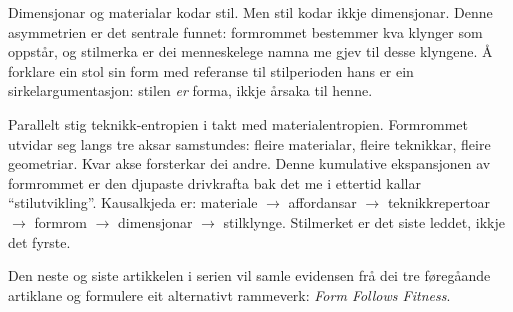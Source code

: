 \documentclass[10pt, a4paper, twocolumn]{article}
\begin{document}
Dimensjonar og materialar kodar stil. Men stil kodar ikkje dimensjonar. Denne asymmetrien er det sentrale funnet: formrommet bestemmer kva klynger som oppstår, og stilmerka er dei menneskelege namna me gjev til desse klyngene. Å forklare ein stol sin form med referanse til stilperioden hans er ein sirkelargumentasjon: stilen \emph{er} forma, ikkje årsaka til henne.

Parallelt stig teknikk-entropien i takt med materialentropien. Formrommet utvidar seg langs tre aksar samstundes: fleire materialar, fleire teknikkar, fleire geometriar. Kvar akse forsterkar dei andre. Denne kumulative ekspansjonen av formrommet er den djupaste drivkrafta bak det me i ettertid kallar ``stilutvikling''. Kausalkjeda er: materiale $\rightarrow$ affordansar $\rightarrow$ teknikkrepertoar $\rightarrow$ formrom $\rightarrow$ dimensjonar $\rightarrow$ stilklynge. Stilmerket er det siste leddet, ikkje det fyrste.

Den neste og siste artikkelen i serien vil samle evidensen frå dei tre føregåande artiklane og formulere eit alternativt rammeverk: \emph{Form Follows Fitness}.


\newpage
\onecolumn


\end{document}
